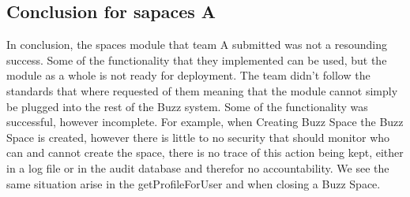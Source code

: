 \subsection{Conclusion for sapaces A}
In conclusion, the spaces module that team A submitted was not a resounding success. Some of the functionality that they implemented can be used, but the module as a whole is not ready for deployment. The team didn’t follow the standards that where requested of them meaning that the module cannot simply be plugged into the rest of the Buzz system. Some of the functionality was successful, however incomplete. For example, when Creating Buzz Space the Buzz Space is created, however there is little to no security that should monitor who can and cannot create the space, there is no trace of this action being kept, either in a log file or in the audit database and therefor no accountability. We see the same situation arise in the getProfileForUser and when closing a Buzz Space.